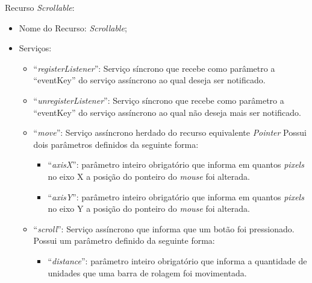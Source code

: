 Recurso \emph{Scrollable}:

\begin{itemize}
	
	\item Nome do Recurso: \emph{Scrollable};

	\item Serviços:
		
		\begin{itemize}
			
			\item ``\emph{registerListener}'': Serviço síncrono que recebe como parâmetro a ``eventKey'' do serviço assíncrono ao qual deseja ser notificado.

			\item ``\emph{unregisterListener}'': Serviço síncrono que recebe como parâmetro a ``eventKey'' do serviço assíncrono ao qual não deseja mais ser notificado.

			\item ``\emph{move}'': Serviço assíncrono herdado do recurso equivalente \emph{Pointer} Possui dois parâmetros definidos da seguinte forma:

				\begin{itemize}
					\item ``\emph{axisX}'': parâmetro inteiro obrigatório que informa em quantos \emph{pixels} no eixo X a posição do ponteiro do \emph{mouse} foi alterada.

					\item ``\emph{axisY}'': parâmetro inteiro obrigatório que informa em quantos \emph{pixels} no eixo Y a posição do ponteiro do \emph{mouse} foi alterada.
				\end{itemize}
			
			\item ``\emph{scroll}'': Serviço assíncrono que informa que um botão foi pressionado. Possui um parâmetro definido da seguinte forma:

				\begin{itemize}
					\item ``\emph{distance}'': parâmetro inteiro obrigatório que informa a quantidade de unidades que uma barra de rolagem foi movimentada.
				\end{itemize}

		\end{itemize}
\end{itemize}

